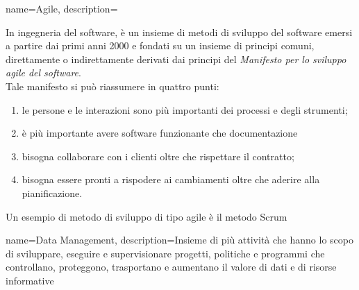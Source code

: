 
\renewcommand{\acronymname}{Acronimi e abbreviazioni}

{
	name=Agile,
	description={
		 In ingegneria del software, è un insieme di metodi di sviluppo del software emersi a partire dai primi anni 2000 e fondati su un insieme di principi comuni, direttamente o indirettamente derivati dai principi del \textit{Manifesto per lo sviluppo agile del software}\cite{manifestoAgile}.\\
		 Tale manifesto si può riassumere in quattro punti:
		 \begin{enumerate}
		 	\item le persone e le interazioni sono più importanti dei processi e degli strumenti;
		 	\item è più importante avere software funzionante che documentazione
		 	\item bisogna collaborare con i clienti oltre che rispettare il contratto;
		 	\item bisogna essere pronti a rispodere ai cambiamenti oltre che aderire alla pianificazione.
		 \end{enumerate}
		 Un esempio di metodo di sviluppo di tipo agile è il metodo \gls{Scrum} \cite{scrum}}
}
{
	name=Data Management,
	description={Insieme di più attività che hanno lo scopo di sviluppare, eseguire e supervisionare progetti, politiche e programmi che controllano, proteggono, trasportano e aumentano il valore di dati e di risorse informative}
}
